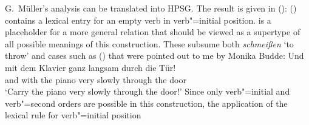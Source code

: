 \begin{exe}
\begin{xlist}[iv.]
\begin{exe}
\begin{xlist}[iv.]
G.\ Müller's analysis can be translated into HPSG. The result is given in ():
\ea
{}
\z
() contains a lexical entry for an empty verb in verb"=initial position. 
is a placeholder for a more general relation that should be viewed as a supertype of all possible meanings of this
construction. These subsume both \emph{schmeißen} `to throw' and cases such as () that were pointed out to me by Monika Budde:
\ea
\label{Klavier-durch-die-Tuer}
\gll Und mit dem Klavier ganz langsam durch die Tür!\\
	 and with the piano very slowly through the door\\
\glt `Carry the piano very slowly through the door!'
\z
Since only verb"=initial and verb"=second orders are possible in this construction, the application of the lexical rule for verb"=initial position

\end{xlist}
\end{exe}
\end{xlist}
\end{exe}
